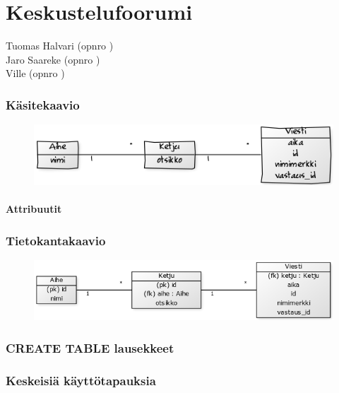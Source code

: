 \documentclass[12pt,a4paper]{article}
\begin{document}
\part*{Keskustelufoorumi}
Tuomas Halvari (opnro ) \\
Jaro Saareke (opnro ) \\
Ville  (opnro )
\newpage
\section{Käsitekaavio}
\begin{figure}[h]
\includegraphics[width=\textwidth]{6bd37a82}
\end{figure}
\subsection{Attribuutit}
\section{Tietokantakaavio}
\begin{figure}[h]
\includegraphics[width=\textwidth]{2ca63d43}
\end{figure}
\section{CREATE TABLE lausekkeet}
\section{Keskeisiä käyttötapauksia}
\end{document}
